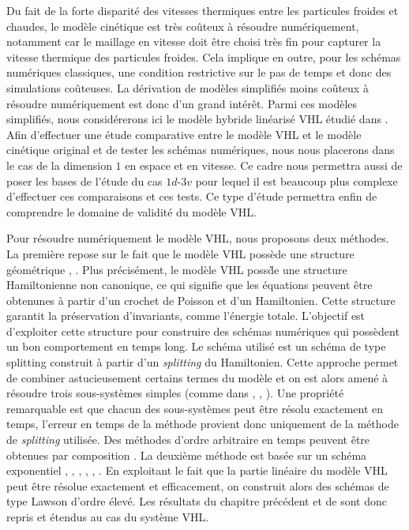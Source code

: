 Du fait de la forte disparité des vitesses thermiques entre les particules froides et chaudes, le modèle cinétique est très coûteux à résoudre numériquement, notamment car le maillage en vitesse doit être choisi très fin pour capturer la vitesse thermique des particules froides. Cela implique en outre, pour les schémas numériques classiques, une condition restrictive sur le pas de temps et 
donc des simulations co\^uteuses. La dérivation de modèles simplifi\'es moins coûteux à résoudre numériquement est donc d'un grand int\'er\^et. Parmi ces mod\`eles simplifi\'es, 
nous consid\'ererons ici le mod\`ele hybride lin\'earis\'e VHL \'etudi\'e dans \cite{Holderied:2019}.  
Afin d'effectuer une \'etude comparative entre le mod\`ele VHL et le mod\`ele cin\'etique original 
et de tester les sch\'emas num\'eriques, nous nous placerons dans le cas de la dimension $1$ 
en espace et en vitesse. Ce cadre nous permettra aussi de poser les bases de l'\'etude 
du cas $1d$-$3v$ pour lequel il est beaucoup plus complexe d'effectuer ces comparaisons et ces tests. Ce type d'\'etude permettra enfin de comprendre le domaine de validité du mod\`ele VHL. 

Pour résoudre numériquement le modèle VHL, nous proposons deux méthodes. La première repose sur le fait que le modèle VHL possède une structure géométrique \cite{Morrison:2017}\cite{Tronci:2010}, \cite{Tronci:2014}. Plus pr\'ecis\'ement, le mod\`ele VHL poss\`de une structure Hamiltonienne non canonique, ce qui signifie que les \'equations peuvent \^etre 
obtenunes \`a partir d'un crochet de Poisson et d'un Hamiltonien. Cette structure garantit la préservation d'invariants, comme l'énergie totale. L'objectif est d'exploiter cette structure 
pour construire des sch\'emas num\'eriques qui poss\`edent un bon comportement en temps long. 
Le sch\'ema utilis\'e est un sch\'ema de type splitting construit \`a partir d'un \emph{splitting} du Hamiltonien. Cette approche permet de combiner astucieusement certains termes du mod\`ele et 
on est alors amené à résoudre trois sous-systèmes simples (comme dans \cite{Crouseilles:2015}, \cite{Casas:2017}, \cite{Li:2020}). Une propriété remarquable est que chacun des sous-systèmes peut être résolu exactement en temps, l'erreur en temps de la méthode provient donc uniquement de la méthode de \emph{splitting} utilisée. Des méthodes d'ordre arbitraire en temps peuvent être obtenues par composition \cite{Hairer:2006}. 
La deuxième méthode est basée sur un schéma exponentiel \cite{Hochbruck:2010}, \cite{Hochbruck:2005}, \cite{Lawson:1967a}, \cite{Isherwood:2018}, \cite{Lawson:1967}, \cite{Crouseilles:2019b}. En exploitant le fait que la partie linéaire du modèle VHL peut être résolue exactement et efficacement, on construit alors des schémas de type Lawson d'ordre élevé. Les r\'esultats du chapitre pr\'ec\'edent et de \cite{Crouseilles:2019b} sont donc repris et \'etendus au cas du syst\`eme VHL. 

